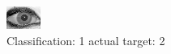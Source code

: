 \begin{figure}[h!]
\begin{center}
\includegraphics[width=0.60\columnwidth]{figures/ID2023_class_1_target_2.png}
\end{center}
\caption{ Classification: 1 actual target: 2}
\label{fig:ID2023_class_1_target_2}
\end{figure}
